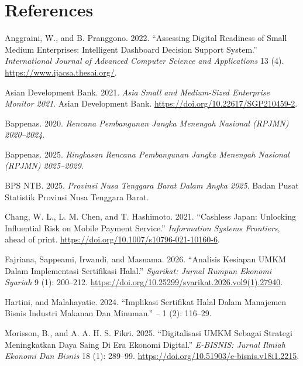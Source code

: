 \documentclass[
  default,
]{sn-jnl}
\newlength{\cslhangindent}
\newenvironment{CSLReferences}[2] %
 {\begin{list}{}{%
  \setlength{\itemindent}{0pt}
  \setlength{\leftmargin}{0pt}
  \setlength{\parsep}{0pt}
  \ifodd #1
   \setlength{\leftmargin}{\cslhangindent}
   \setlength{\itemindent}{-1\cslhangindent}
  \fi
  \setlength{\itemsep}{#2\baselineskip}}}
 {\end{list}}
\begin{document}
\section*{References}\label{references}

\protect{}\label{refs}
\begin{CSLReferences}{1}{1}
Anggraini, W., and B. Pranggono. 2022. {``Assessing Digital Readiness of
Small Medium Enterprises: Intelligent Dashboard Decision Support
System.''} \emph{International Journal of Advanced Computer Science and
Applications} 13 (4). \url{https://www.ijacsa.thesai.org/}.

Asian Development Bank. 2021. \emph{Asia Small and Medium-Sized
Enterprise Monitor 2021}. Asian Development Bank.
\url{https://doi.org/10.22617/SGP210459-2}.

Bappenas. 2020. \emph{Rencana Pembangunan Jangka Menengah Nasional
(RPJMN) 2020--2024}.

Bappenas. 2025. \emph{Ringkasan Rencana Pembangunan Jangka Menengah
Nasional (RPJMN) 2025--2029}.

BPS NTB. 2025. \emph{Provinsi Nusa Tenggara Barat Dalam Angka 2025}.
Badan Pusat Statistik Provinsi Nusa Tenggara Barat.

Chang, W. L., L. M. Chen, and T. Hashimoto. 2021. {``Cashless Japan:
Unlocking Influential Risk on Mobile Payment Service.''}
\emph{Information Systems Frontiers}, ahead of print.
\url{https://doi.org/10.1007/s10796-021-10160-6}.

Fajriana, Sappeami, Irwandi, and Masnama. 2026. {``Analisis Kesiapan
UMKM Dalam Implementasi Sertifikasi Halal.''} \emph{Syarikat: Jurnal
Rumpun Ekonomi Syariah} 9 (1): 200--212.
\url{https://doi.org/10.25299/syarikat.2026.vol9(1).27940}.

Hartini, and Malahayatie. 2024. {``Implikasi Sertifikat Halal Dalam
Manajemen Bisnis Industri Makanan Dan Minuman.''} \emph{--} 1 (2):
116--29.

Morisson, B., and A. A. H. S. Fikri. 2025. {``Digitalisasi UMKM Sebagai
Strategi Meningkatkan Daya Saing Di Era Ekonomi Digital.''}
\emph{E-BISNIS: Jurnal Ilmiah Ekonomi Dan Bisnis} 18 (1): 289--99.
\url{https://doi.org/10.51903/e-bisnis.v18i1.2215}.


\end{CSLReferences}
\end{document}
